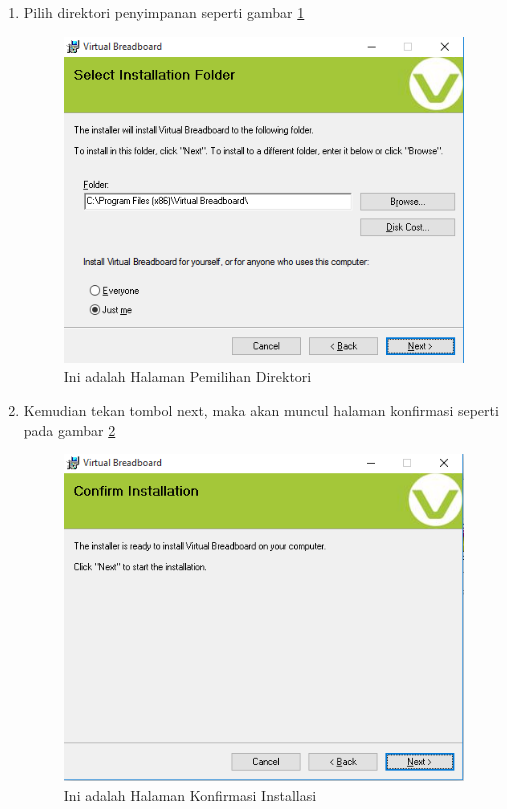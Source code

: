 \begin{enumerate}
\item Pilih direktori penyimpanan seperti gambar \ref{fig:memilihdirektori}
\begin{figure}[!htbp]
  \centering
  \includegraphics[width=.75\textwidth]{figures/VBB/memilihdirektori.png}
  \caption{Ini adalah Halaman Pemilihan Direktori}\label{fig:memilihdirektori}
\end{figure}


\item Kemudian tekan tombol next, maka akan muncul halaman konfirmasi seperti pada gambar \ref{fig:konfirmasiinstall}
\begin{figure}[!htbp]
  \centering
  \includegraphics[width=.75\textwidth]{figures/VBB/konfirmasiinstall.png}
  \caption{Ini adalah Halaman Konfirmasi Installasi}\label{fig:konfirmasiinstall}
\end{figure}
\end{enumerate} 
